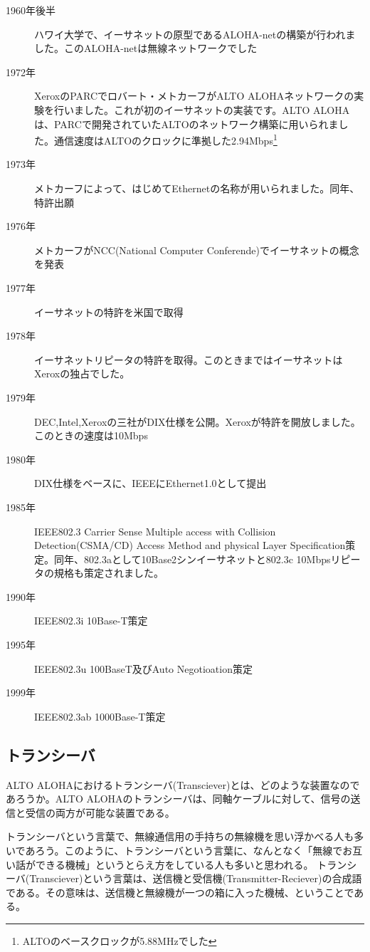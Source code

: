 \begin{description}
\item[1960年後半]ハワイ大学で、イーサネットの原型であるALOHA-netの構築が行われました。このALOHA-netは無線ネットワークでした
\item[1972年]XeroxのPARCでロバート・メトカーフがALTO ALOHAネットワークの実験を行いました。これが初のイーサネットの実装です。ALTO ALOHAは、PARCで開発されていたALTOのネットワーク構築に用いられました。通信速度はALTOのクロックに準拠した2.94Mbps\footnote{ALTOのベースクロックが5.88MHzでした}
\item[1973年]メトカーフによって、はじめてEthernetの名称が用いられました。同年、特許出願
\item[1976年]メトカーフがNCC(National Computer Conferende)でイーサネットの概念を発表
\item[1977年]イーサネットの特許を米国で取得
\item[1978年]イーサネットリピータの特許を取得。このときまではイーサネットはXeroxの独占でした。
\item[1979年]DEC,Intel,Xeroxの三社がDIX仕様を公開。Xeroxが特許を開放しました。このときの速度は10Mbps
\item[1980年]DIX仕様をベースに、IEEEにEthernet1.0として提出
\item[1985年]IEEE802.3 Carrier Sense Multiple access with Collision Detection(CSMA/CD) Access Method and physical Layer Specification策定。同年、802.3aとして10Base2シンイーサネットと802.3c 10Mbpsリピータの規格も策定されました。
\item[1990年]IEEE802.3i 10Base-T策定
\item[1995年]IEEE802.3u 100BaseT及びAuto Negotioation策定
\item[1999年]IEEE802.3ab 1000Base-T策定
\end{description}



\subsection{トランシーバ}

ALTO ALOHAにおけるトランシーバ(Transciever)とは、どのような装置なのであろうか。ALTO ALOHAのトランシーバは、同軸ケーブルに対して、信号の送信と受信の両方が可能な装置である。

トランシーバという言葉で、無線通信用の手持ちの無線機を思い浮かべる人も多いであろう。このように、トランシーバという言葉に、なんとなく「無線でお互い話ができる機械」というとらえ方をしている人も多いと思われる。
トランシーバ(Transciever)という言葉は、送信機と受信機(Transmitter-Reciever)の合成語である。その意味は、送信機と無線機が一つの箱に入った機械、ということである。

